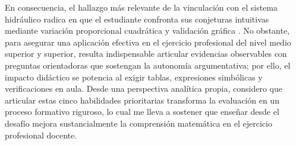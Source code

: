 \documentclass[spanish,letterpaper,oneside]{article}
\begin{document}
En consecuencia, el hallazgo más relevante de la vinculación con el sistema hidráulico radica en que el estudiante confronta sus conjeturas intuitivas mediante variación proporcional cuadrática y validación gráfica \citep{alsina_planas2008}. No obstante, para asegurar una aplicación efectiva en el ejercicio profesional del nivel medio superior y superior, resulta indispensable articular evidencias observables con preguntas orientadoras que sostengan la autonomía argumentativa; por ello, el impacto didáctico se potencia al exigir tablas, expresiones simbólicas y verificaciones en aula. Desde una perspectiva analítica propia, considero que articular estas cinco habilidades prioritarias transforma la evaluación en un proceso formativo riguroso, lo cual me lleva a sostener que enseñar desde el desafío mejora sustancialmente la comprensión matemática en el ejercicio profesional docente.

\newsavebox{\hiddenbibbox}
\begin{lrbox}{\hiddenbibbox}\begin{minipage}{\textwidth}\end{minipage}\end{lrbox}
\end{document}
